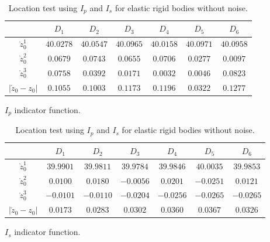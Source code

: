 \documentclass[a4paper,11pt]{article}
\theoremstyle{remark}
\theoremstyle{definition}
\numberwithin{equation}{section}
\begin{document}
\begin{table}

\hfill{}%
\begin{tabular}{|c|c|c|c|c|c|c|}
\hline
 & $D_{1}$ & $D_{2}$ & $D_{3}$ & $D_{4}$ & $D_{5}$ & $D_{6}$\tabularnewline
\hline
\hline
$\mathring{z}_{0}^{1}$ & $40.0278$ & $40.0547$ & $40.0965$ & $40.0158$ & $40.0971$ & $40.0958$\tabularnewline
\hline
$\mathring{z}_{0}^{2}$ & $0.0679$ & $0.0743$ & $0.0655$ & $0.0706$ & $0.0277$ & $0.0097$\tabularnewline
\hline
$\mathring{z}_{0}^{3}$ & $0.0758$ & $0.0392$ & $0.0171$ & $0.0032$ & $0.0046$ & $0.0823$\tabularnewline
\hline
$\left|\mathring{z}_{0}-z_{0}\right|$ & $0.1055$ & $0.1003$ & $0.1173$ & $0.1196$ & $0.0322$ & $0.1277$\tabularnewline
\hline
\end{tabular}\hfill{}

\smallskip


\hfill{}$I_{p}$  indicator function.\hfill{}

\medskip

\hfill{}%
\begin{tabular}{|c|c|c|c|c|c|c|}
\hline
 & $D_{1}$ & $D_{2}$ & $D_{3}$ & $D_{4}$ & $D_{5}$ & $D_{6}$\tabularnewline
\hline
\hline
$\mathring{z}_{0}^{1}$ & $39.9901$ & $39.9811$ & $39.9784$ & $39.9846$ & $40.0035$ & $39.9853$\tabularnewline
\hline
$\mathring{z}_{0}^{2}$ & $0.0100$ & $0.0180$ & $-0.0056$ & $0.0201$ & $-0.0251$ & $0.0121$\tabularnewline
\hline
$\mathring{z}_{0}^{3}$ & $-0.0101$ & $-0.0110$ & $-0.0204$ & $-0.0256$ & $-0.0265$ & $-0.0265$\tabularnewline
\hline
$\left|\mathring{z}_{0}-z_{0}\right|$ & $0.0173$ & $0.0283$ & $0.0302$ & $0.0360$ & $0.0367$ & $0.0326$\tabularnewline
\hline
\end{tabular}\hfill{}

\smallskip

\hfill{}$I_{s}$  indicator function.\hfill{}

\caption{\label{tab:location-test-pec} Location test using $I_{p}$ and $I_{s}$  for elastic  rigid bodies without noise. }
\end{table}
\end{document}
